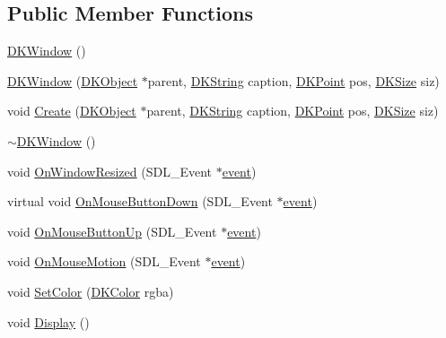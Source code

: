 \subsection*{Public Member Functions}
\begin{DoxyCompactItemize}
\item 
\hyperlink{class_d_k_window_a06fed38d62c24d718200dd2cb42c9af7}{D\-K\-Window} ()
\item 
\hyperlink{class_d_k_window_a010b151d874f6bb4986fbdac520f5fd1}{D\-K\-Window} (\hyperlink{class_d_k_object}{D\-K\-Object} $\ast$parent, \hyperlink{_d_k_string_8h_ac168e8555ceba18e1a2919b21976bc84}{D\-K\-String} caption, \hyperlink{_d_k_axis_8h_a0ca1f005fbb936f8e7a7f2433591f418}{D\-K\-Point} pos, \hyperlink{_d_k_axis_8h_aaa25a8c7cbf504fffdb8a4208ff7a731}{D\-K\-Size} siz)
\item 
void \hyperlink{class_d_k_window_a3231d55cad7019df746c14f9a337017a}{Create} (\hyperlink{class_d_k_object}{D\-K\-Object} $\ast$parent, \hyperlink{_d_k_string_8h_ac168e8555ceba18e1a2919b21976bc84}{D\-K\-String} caption, \hyperlink{_d_k_axis_8h_a0ca1f005fbb936f8e7a7f2433591f418}{D\-K\-Point} pos, \hyperlink{_d_k_axis_8h_aaa25a8c7cbf504fffdb8a4208ff7a731}{D\-K\-Size} siz)
\item 
\hyperlink{class_d_k_window_aa088eb13ff41881edde5ab88d63668e5}{$\sim$\-D\-K\-Window} ()
\item 
void \hyperlink{class_d_k_window_aad23d7482a3a4fc19374211b702c720a}{On\-Window\-Resized} (S\-D\-L\-\_\-\-Event $\ast$\hyperlink{class_d_k_event_a3deebb932ed734363c4ece87971bc45f}{event})
\item 
virtual void \hyperlink{class_d_k_window_abdf86d93190b7ba0ec1702421e3c653a}{On\-Mouse\-Button\-Down} (S\-D\-L\-\_\-\-Event $\ast$\hyperlink{class_d_k_event_a3deebb932ed734363c4ece87971bc45f}{event})
\item 
void \hyperlink{class_d_k_window_afe21acd61f1c5af92659f20b3ade3437}{On\-Mouse\-Button\-Up} (S\-D\-L\-\_\-\-Event $\ast$\hyperlink{class_d_k_event_a3deebb932ed734363c4ece87971bc45f}{event})
\item 
void \hyperlink{class_d_k_window_a40aaa561983c88929e4215c1527f456b}{On\-Mouse\-Motion} (S\-D\-L\-\_\-\-Event $\ast$\hyperlink{class_d_k_event_a3deebb932ed734363c4ece87971bc45f}{event})
\item 
void \hyperlink{class_d_k_window_ad1a86a9ae5184d7b7202ba4df8cc6742}{Set\-Color} (\hyperlink{class_d_k_color}{D\-K\-Color} rgba)
\item 
void \hyperlink{class_d_k_window_ae99e263895f48fb458828336eeeecdb7}{Display} ()
\end{DoxyCompactItemize}

